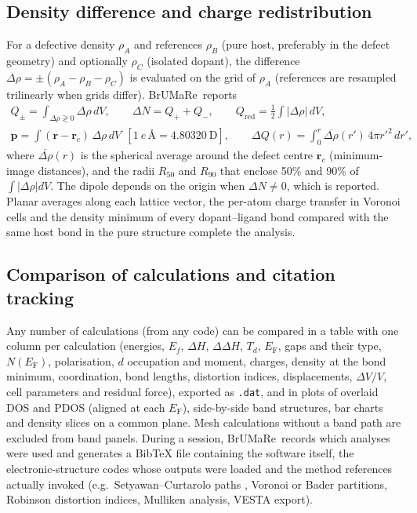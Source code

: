 \documentclass[11pt,a4paper]{article}
\newcommand{\eF}{E_\mathrm{F}}
\newcommand{\code}[1]{\texttt{#1}}
\newcommand{\BMR}{\textsf{BrUMa\textcolor[HTML]{B26B00}{Re}}}
\begin{document}
\subsection{Density difference and charge redistribution}
For a defective density $\rho_A$ and references $\rho_B$ (pure host, preferably in the defect geometry) and optionally $\rho_C$ (isolated dopant), the difference $\Delta\rho=\pm(\rho_A-\rho_B-\rho_C)$ is evaluated on the grid of $\rho_A$ (references are resampled trilinearly when grids differ). \BMR\ reports
\begin{gather}
Q_\pm=\int_{\Delta\rho\gtrless0}\Delta\rho\,dV,\qquad \Delta N=Q_++Q_-,\qquad Q_\mathrm{red}=\tfrac12\int|\Delta\rho|\,dV,\\
\mathbf p=\int(\mathbf r-\mathbf r_c)\,\Delta\rho\,dV\ \ [1\ e\,\text{\AA}=4.80320\ \mathrm D],\qquad
\Delta Q(r)=\int_0^{r}\overline{\Delta\rho}(r')\,4\pi r'^2\,dr',
\end{gather}
where $\overline{\Delta\rho}(r)$ is the spherical average around the defect centre $\mathbf r_c$ (minimum-image distances), and the radii $R_{50}$ and $R_{90}$ that enclose 50\% and 90\% of $\int|\Delta\rho|dV$. The dipole depends on the origin when $\Delta N\neq0$, which is reported. Planar averages along each lattice vector, the per-atom charge transfer in Voronoi cells and the density minimum of every dopant–ligand bond compared with the same host bond in the pure structure complete the analysis.

\subsection{Comparison of calculations and citation tracking}
Any number of calculations (from any code) can be compared in a table with one column per calculation (energies, $E_f$, $\Delta H$, $\Delta\Delta H$, $T_d$, $\eF$, gaps and their type, $N(\eF)$, polarisation, $d$ occupation and moment, charges, density at the bond minimum, coordination, bond lengths, distortion indices, displacements, $\Delta V/V$, cell parameters and residual force), exported as \code{.dat}, and in plots of overlaid DOS and PDOS (aligned at each $\eF$), side-by-side band structures, bar charts and density slices on a common plane. Mesh calculations without a band path are excluded from band panels. During a session, \BMR\ records which analyses were used and generates a BibTeX file containing the software itself, the electronic-structure codes whose outputs were loaded and the method references actually invoked (e.g.\ Setyawan–Curtarolo paths \cite{setyawan2010}, Voronoi or Bader partitions, Robinson distortion indices, Mulliken analysis, VESTA export).
\end{document}

